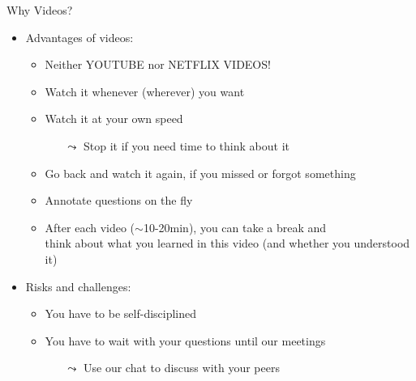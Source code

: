 \documentclass[aspectratio=169]{../latex_main/tntbeamer}  %
\begin{document}
\begin{frame}[c]{Why Videos?}

\begin{itemize}
  \item Advantages of videos:
  \begin{itemize}
      \item Neither YOUTUBE nor NETFLIX VIDEOS!
      \item Watch it whenever (wherever) you want
      \item Watch it at your own speed
      \begin{itemize}
          \item[$\leadsto$] Stop it if you need time to think about it
      \end{itemize}
      \item Go back and watch it again, if you missed or forgot something
      \item Annotate questions on the fly %
      \item After each video ($\sim$10-20min), you can take a break and\\ think about what you learned in this video (and whether you understood it)
  \end{itemize}
  \medskip
  \pause
  \item Risks and challenges:
  \begin{itemize}
      \item You have to be self-disciplined 
      \item You have to wait with your questions until our meetings
      \begin{itemize}
          \item[$\leadsto$] Use our chat to discuss with your peers
      \end{itemize}
  \end{itemize}
\end{itemize}

\end{frame}
\end{document}
